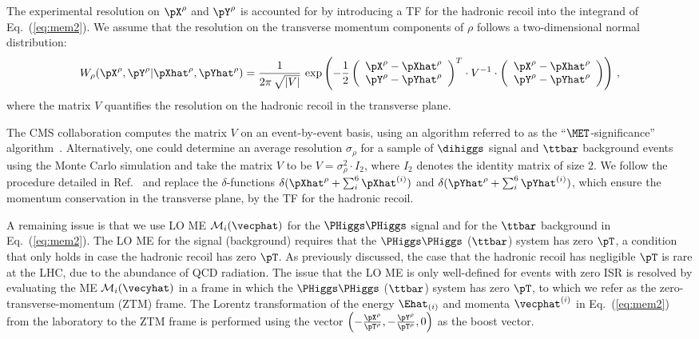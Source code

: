 The experimental resolution on $\pX^{\rho}$ and $\pY^{\rho}$ is accounted for by introducing a TF for the hadronic recoil into the integrand of Eq.~(\ref{eq:mem2}).
We assume that the resolution on the transverse momentum components of $\rho$ follows a two-dimensional normal distribution:
\begin{equation}
W_{\rho}( \pX^{\rho},\pY^{\rho} | \pXhat^{\rho},\pYhat^{\rho} ) = 
 \frac{1}{2\pi \, \sqrt{\vert V \vert}} \, \exp \left( -\frac{1}{2}
 \left( \begin{array}{c} \pX^{\rho} - \pXhat^{\rho} \\ \pY^{\rho} - \pYhat^{\rho} \end{array} \right)^{T}
  \cdot V^{-1} \cdot
   \left( \begin{array}{c} \pX^{\rho} - \pXhat^{\rho} \\ \pY^{\rho} - \pYhat^{\rho} \end{array} \right)
 \right) \, ,
\label{eq:TF_hadRecoil}
\end{equation}
where the matrix $V$ quantifies the resolution on the hadronic recoil in the transverse plane.

The CMS collaboration computes the matrix $V$ on an event-by-event basis, using an algorithm referred to as the ``$\MET$-significance'' algorithm~\cite{JME-10-009}.
Alternatively, one could determine an average resolution $\sigma_{\rho}$ for a sample of $\dihiggs$ signal and $\ttbar$ background events using the Monte Carlo simulation
and take the matrix $V$ to be $V = \sigma_{\rho}^{2} \cdot I_{2}$, where $I_{2}$ denotes the identity matrix of size $2$.
We follow the procedure detailed in Ref.~\cite{SVfitMEM} and replace the $\delta$-functions 
$\delta( \pXhat^{\rho} + \sum_{i}^{6} \pXhat^{(i)})$ and $\delta( \pYhat^{\rho} + \sum_{i}^{6} \pYhat^{(i)})$,
which ensure the momentum conservation in the transverse plane,
by the TF for the hadronic recoil.

A remaining issue is that we use LO ME $\mathcal{M}_{i}(\vecphat)$ for the $\PHiggs\PHiggs$ signal and for the $\ttbar$ background in Eq.~(\ref{eq:mem2}).
The LO ME for the signal (background) requires that the $\PHiggs\PHiggs$ ($\ttbar$) system has zero $\pT$, 
a condition that only holds in case the hadronic recoil has zero $\pT$.
As previously discussed, the case that the hadronic recoil has negligible $\pT$ is rare at the LHC, due to the abundance of QCD radiation.
The issue that the LO ME is only well-defined for events with zero ISR
is resolved by evaluating the ME $\mathcal{M}_{i}(\vecyhat)$ in a frame in which the $\PHiggs\PHiggs$ ($\ttbar$) system has zero $\pT$, 
to which we refer as the zero-transverse-momentum (ZTM) frame.
The Lorentz transformation of the energy $\Ehat_{(i)}$ and momenta $\vecphat^{(i)}$ in Eq.~(\ref{eq:mem2})
from the laboratory to the ZTM frame is performed using the vector $\left(-\frac{\pX^{\rho}}{\pT^{\rho}},-\frac{\pY^{\rho}}{\pT^{\rho}},0\right)$ as the boost vector.

